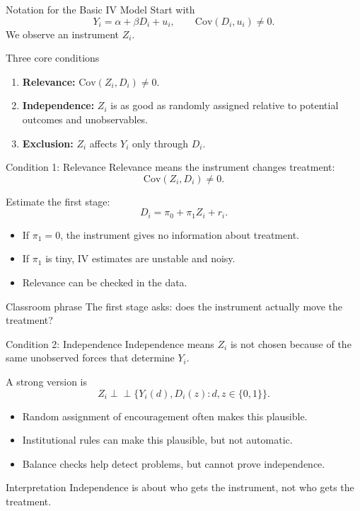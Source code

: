 \documentclass[11pt,aspectratio=169]{beamer}
\newcommand{\Cov}{\mathrm{Cov}}
\newcommand{\indep}{\perp\!\!\!\perp}
\newcommand{\derivbutton}[1]{\vspace{0.4em}\hfill\hyperlink{app:#1}{\beamerbutton{Appendix details}}}
\begin{document}
\begin{frame}{Notation for the Basic IV Model}
  \hypertarget{main:iv-conditions}{}
  Start with
  \[
    Y_i = \alpha + \beta D_i + u_i,
    \qquad
    \Cov(D_i,u_i)\neq 0.
  \]
  We observe an instrument \(Z_i\).

  \begin{block}{Three core conditions}
    \begin{enumerate}
      \item \textbf{Relevance:} \(\Cov(Z_i,D_i)\neq 0\).
      \item \textbf{Independence:} \(Z_i\) is as good as randomly assigned relative to potential outcomes and unobservables.
      \item \textbf{Exclusion:} \(Z_i\) affects \(Y_i\) only through \(D_i\).
    \end{enumerate}
  \end{block}

  \derivbutton{iv-moment}
\end{frame}

\begin{frame}{Condition 1: Relevance}
  Relevance means the instrument changes treatment:
  \[
    \Cov(Z_i,D_i)\neq 0.
  \]

  Estimate the first stage:
  \[
    D_i = \pi_0 + \pi_1 Z_i + r_i.
  \]

  \begin{itemize}
    \item If \(\pi_1=0\), the instrument gives no information about treatment.
    \item If \(\pi_1\) is tiny, IV estimates are unstable and noisy.
    \item Relevance can be checked in the data.
  \end{itemize}

  \begin{block}{Classroom phrase}
    The first stage asks: does the instrument actually move the treatment?
  \end{block}
\end{frame}

\begin{frame}{Condition 2: Independence}
  Independence means \(Z_i\) is not chosen because of the same unobserved forces that determine \(Y_i\).

  A strong version is
  \[
    Z_i \indep \{Y_i(d),D_i(z): d,z\in\{0,1\}\}.
  \]

  \begin{itemize}
    \item Random assignment of encouragement often makes this plausible.
    \item Institutional rules can make this plausible, but not automatic.
    \item Balance checks help detect problems, but cannot prove independence.
  \end{itemize}

  \begin{block}{Interpretation}
    Independence is about who gets the instrument, not who gets the treatment.
  \end{block}
\end{frame}
\end{document}
